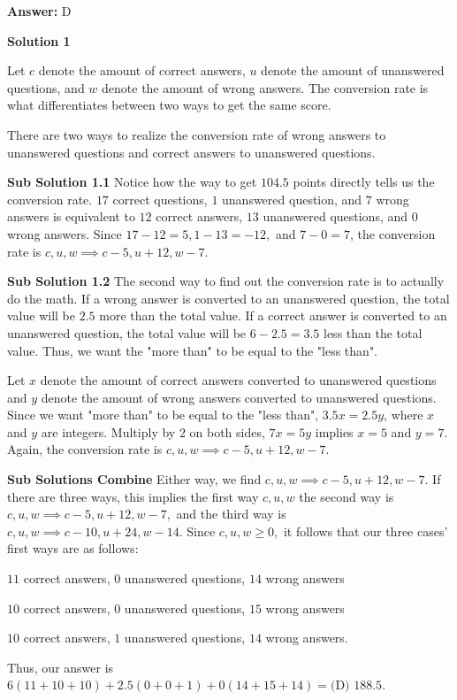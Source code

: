 \begin{enumerate}
 \textbf{Answer: }D



\textbf{Solution 1}

Let $c$ denote the amount of correct answers, $u$ denote the amount of unanswered questions, and $w$ denote the amount of wrong answers. The conversion rate is what differentiates between two ways to get the same score.

 There are two ways to realize the conversion rate of wrong answers to unanswered questions and correct answers to unanswered questions.

 \textbf{Sub Solution 1.1} Notice how the way to get $104.5$ points directly tells us the conversion rate. $17$ correct questions, $1$ unanswered question, and $7$ wrong answers is equivalent to $12$ correct answers, $13$ unanswered questions, and $0$ wrong answers. Since $17-12=5, 1-13=-12,$ and $7-0=7$, the conversion rate is $c, u, w \implies c-5, u+12, w-7.$

 \textbf{Sub Solution 1.2} The second way to find out the conversion rate is to actually do the math. If a wrong answer is converted to an unanswered question, the total value will be $2.5$ more than the total value. If a correct answer is converted to an unanswered question, the total value will be $6-2.5=3.5$ less than the total value. Thus, we want the "more than" to be equal to the "less than". 

 Let $x$ denote the amount of correct answers converted to unanswered questions and $y$ denote the amount of wrong answers converted to unanswered questions. Since we want "more than" to be equal to the "less than", $3.5x=2.5y$, where $x$ and $y$ are integers. Multiply by $2$ on both sides, $7x=5y$ implies $x=5$ and $y=7.$ Again, the conversion rate is $c, u, w \implies c-5, u+12, w-7.$ 

 \textbf{Sub Solutions Combine} Either way, we find $c, u, w \implies c-5, u+12, w-7.$ If there are three ways, this implies the first way $c, u, w$ the second way is $c, u, w \implies c-5, u+12, w-7,$ and the third way is $c, u, w \implies c-10, u+24, w-14.$ Since $c, u, w \geq0,$ it follows that our three cases' first ways are as follows:

 
$11$ correct answers, $0$ unanswered questions, $14$ wrong answers

 $10$ correct answers, $0$ unanswered questions, $15$ wrong answers

 $10$ correct answers, $1$ unanswered questions, $14$ wrong answers.

 
Thus, our answer is $6(11+10+10)+2.5(0+0+1)+0(14+15+14)=\boxed {\text{(D) }188.5}.$





\end{enumerate}
